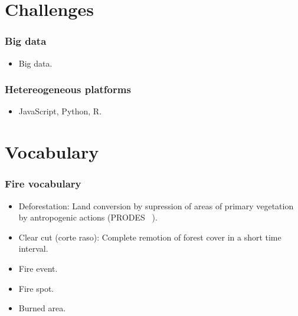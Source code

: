 \documentclass{beamer}
\begin{document}
\section{Challenges}

\begin{frame}[t, allowframebreaks]
    \frametitle{Big data}
    \begin{itemize}
        \item Big data.
    \end{itemize}
\end{frame}



\begin{frame}[t, allowframebreaks]
    \frametitle{Hetereogeneous platforms}
    \begin{itemize}
        \item JavaScript, Python, R.
    \end{itemize}
\end{frame}



\section{Vocabulary}

\begin{frame}[t, allowframebreaks]
    \frametitle{Fire vocabulary}
    \begin{itemize}
        \item Deforestation: Land conversion by supression of areas of 
            primary vegetation by antropogenic actions (PRODES
            ~\citep{dealmeida2022}). 
        \item Clear cut (corte raso): Complete remotion of forest cover in a 
            short time interval.
        \item Fire event.
        \item Fire spot.
        \item Burned area.
    \end{itemize}
\end{frame}



\end{document}
